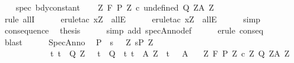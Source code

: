 \begin{isabellebody}
\ \ \isamarkupfalse%
\ spec\ bdy{\isacharunderscore}constant\isanewline
\ \ \isamarkupfalse%
\ {\isachardoublequoteopen}{\isasymforall}Z{\isachardot}\ {\isasymGamma}{\isacharcomma}{\isasymTheta}{\isasymturnstile}\isactrlbsub {\isacharslash}F\isactrlesub \ {\isacharparenleft}{\isacharparenleft}P{\isacharprime}\ Z{\isacharparenright}{\isacharparenright}\ {\isacharparenleft}c\ undefined{\isacharparenright}\ {\isacharparenleft}Q{\isacharprime}\ Z{\isacharparenright}{\isacharcomma}{\isacharparenleft}A{\isacharprime}\ Z{\isacharparenright}{\isachardoublequoteclose}\isanewline
\ \ \ \ \isamarkupfalse%
\ {\isacharminus}\ \isanewline
\ \ \ \ \isamarkupfalse%
\ {\isacharparenleft}rule\ allI{\isacharparenright}\isanewline
\ \ \ \ \isamarkupfalse%
\ {\isacharparenleft}erule{\isacharunderscore}tac\ x{\isacharequal}Z\ \ allE{\isacharparenright}\isanewline
\ \ \ \ \isamarkupfalse%
\ {\isacharparenleft}erule{\isacharunderscore}tac\ x{\isacharequal}Z\ \ allE{\isacharparenright}\isanewline
\ \ \ \ \isamarkupfalse%
\ simp\isanewline
\ \ \ \ \isamarkupfalse%
\isanewline
\ \ \isamarkupfalse%
\ consequence\ \isamarkupfalse%
\ {\isacharquery}thesis\isanewline
\ \ \ \ \isamarkupfalse%
\ {\isacharparenleft}simp\ add{\isacharcolon}\ specAnno{\isacharunderscore}def{\isacharparenright}\isanewline
\ \ \ \ \isamarkupfalse%
\ {\isacharparenleft}erule\ conseq{\isacharparenright}\isanewline
\ \ \ \ \isamarkupfalse%
\ blast\isanewline
\ \ \ \ \isamarkupfalse%
\isanewline
{}\isamarkupfalse%
%
\endisatagproof
{\isafoldproof}%
%
\isadelimproof
\isanewline
%
\endisadelimproof
\isanewline
{}\isamarkupfalse%
\ SpecAnno{\isacharprime}{\isacharcolon}\ \isanewline
\ {\isachardoublequoteopen}{\isasymlbrakk}P\ {\isasymsubseteq}\ {\isacharbraceleft}s{\isachardot}\ \ {\isasymexists}\ Z{\isachardot}\ s{\isasymin}P{\isacharprime}\ Z\ {\isasymand}\ \isanewline
\ \ \ \ \ \ \ \ \ \ \ \ {\isacharparenleft}{\isasymforall}t{\isachardot}\ t\ {\isasymin}\ Q{\isacharprime}\ Z\ {\isasymlongrightarrow}\ \ t\ {\isasymin}\ Q{\isacharparenright}\ {\isasymand}\ {\isacharparenleft}{\isasymforall}t{\isachardot}\ t\ {\isasymin}\ A{\isacharprime}\ Z\ {\isasymlongrightarrow}\ t\ {\isasymin}\ \ A{\isacharparenright}{\isacharbraceright}{\isacharsemicolon}\isanewline
\ \ \ {\isasymforall}Z{\isachardot}\ {\isasymGamma}{\isacharcomma}{\isasymTheta}{\isasymturnstile}\isactrlbsub {\isacharslash}F\isactrlesub \ {\isacharparenleft}P{\isacharprime}\ Z{\isacharparenright}\ {\isacharparenleft}c\ Z{\isacharparenright}\ {\isacharparenleft}Q{\isacharprime}\ Z{\isacharparenright}{\isacharcomma}{\isacharparenleft}A{\isacharprime}\ Z{\isacharparenright}{\isacharsemicolon}\isanewline

\end{isabellebody}
